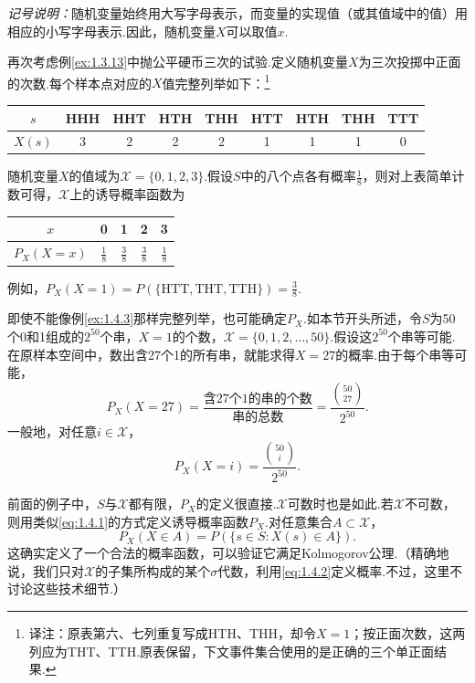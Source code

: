 \emph{记号说明：}随机变量始终用大写字母表示，而变量的实现值（或其值域中的值）用相应的小写字母表示.因此，随机变量$X$可以取值$x$.

\begin{example}[抛硬币三次——II]\label{ex:1.4.3}
再次考虑例\ref{ex:1.3.13}中抛公平硬币三次的试验.定义随机变量$X$为三次投掷中正面的次数.每个样本点对应的$X$值完整列举如下：\footnote{译注：原表第六、七列重复写成HTH、THH，却令$X=1$；按正面次数，这两列应为THT、TTH.原表保留，下文事件集合使用的是正确的三个单正面结果.}
\begin{center}\begin{tabular}{c|cccccccc}\hline
$s$&HHH&HHT&HTH&THH&HTT&HTH&THH&TTT\\\hline
$X(s)$&3&2&2&2&1&1&1&0\\\hline
\end{tabular}\end{center}
随机变量$X$的值域为$\mathscr X=\{0,1,2,3\}$.假设$S$中的八个点各有概率$\frac18$，则对上表简单计数可得，$\mathscr X$上的诱导概率函数为
\begin{center}\begin{tabular}{c|cccc}
$x$&0&1&2&3\\\hline
$P_X(X=x)$&$\frac18$&$\frac38$&$\frac38$&$\frac18$\\\hline
\end{tabular}\end{center}
例如，$P_X(X=1)=P(\{\mathrm{HTT,THT,TTH}\})=\frac38$.
\end{example}



\begin{example}[随机变量的分布]\label{ex:1.4.4}
即使不能像例\ref{ex:1.4.3}那样完整列举，也可能确定$P_X$.如本节开头所述，令$S$为50个0和1组成的$2^{50}$个串，$X=\text{1的个数}$，$\mathscr X=\{0,1,2,\ldots,50\}$.假设这$2^{50}$个串等可能.在原样本空间中，数出含27个1的所有串，就能求得$X=27$的概率.由于每个串等可能，
$$P_X(X=27)=\frac{\text{含27个1的串的个数}}{\text{串的总数}}=\frac{\binom{50}{27}}{2^{50}}.$$
一般地，对任意$i\in\mathscr X$，
$$P_X(X=i)=\frac{\binom{50}{i}}{2^{50}}.$$
\end{example}

前面的例子中，$S$与$\mathscr X$都有限，$P_X$的定义很直接.$\mathscr X$可数时也是如此.若$\mathscr X$不可数，则用类似\eqref{eq:1.4.1}的方式定义诱导概率函数$P_X$.对任意集合$A\subset\mathscr X$，
\begin{equation}\label{eq:1.4.2}
P_X(X\in A)=P(\{s\in S:X(s)\in A\}).
\end{equation}
这确实定义了一个合法的概率函数，可以验证它满足Kolmogorov公理.（精确地说，我们只对$\mathscr X$的子集所构成的某个$\sigma$代数，利用\eqref{eq:1.4.2}定义概率.不过，这里不讨论这些技术细节.）

